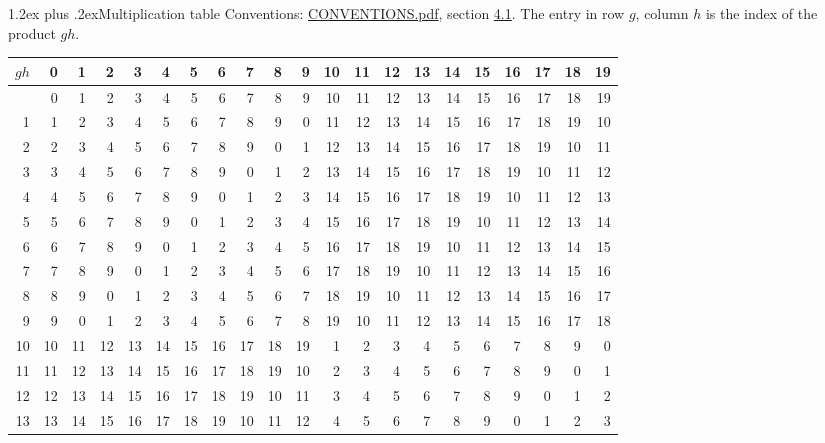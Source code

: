 \documentclass[10pt,a4paper]{article}
\makeatletter
\renewcommand\section{\@startsection{section}{1}{\z@}{-3ex plus -1ex minus -.2ex}%
  {1.2ex plus .2ex}{\normalfont\large\sffamily\bfseries\color{parttitle}}}
\numberwithin{equation}{section}
\makeatother
\begin{document}
\section{Multiplication table}\label{s:multiplication}
Conventions: \href{../../CONVENTIONS.pdf}{CONVENTIONS.pdf}, section \href{../../CONVENTIONS.pdf\#conv.4.1}{4.1}.
The entry in row $g$, column $h$ is the index of the product $gh$.
{\normalsize\setlength{\tabcolsep}{0.1em}\setlength{\LTleft}{-8pt plus 1fill}\setlength{\LTright}{-8pt plus 1fill}\begin{longtable}{@{}r|rrrrrrrrrrrrrrrrrrrr@{}}\toprule
$gh$ & 0 & 1 & 2 & 3 & 4 & 5 & 6 & 7 & 8 & 9 & 10 & 11 & 12 & 13 & 14 & 15 & 16 & 17 & 18 & 19\\\midrule\endhead
\bottomrule\endfoot\endlastfoot
0 & 0 & 1 & 2 & 3 & 4 & 5 & 6 & 7 & 8 & 9 & 10 & 11 & 12 & 13 & 14 & 15 & 16 & 17 & 18 & 19\\*
1 & 1 & 2 & 3 & 4 & 5 & 6 & 7 & 8 & 9 & 0 & 11 & 12 & 13 & 14 & 15 & 16 & 17 & 18 & 19 & 10\\
2 & 2 & 3 & 4 & 5 & 6 & 7 & 8 & 9 & 0 & 1 & 12 & 13 & 14 & 15 & 16 & 17 & 18 & 19 & 10 & 11\\
3 & 3 & 4 & 5 & 6 & 7 & 8 & 9 & 0 & 1 & 2 & 13 & 14 & 15 & 16 & 17 & 18 & 19 & 10 & 11 & 12\\
4 & 4 & 5 & 6 & 7 & 8 & 9 & 0 & 1 & 2 & 3 & 14 & 15 & 16 & 17 & 18 & 19 & 10 & 11 & 12 & 13\\
5 & 5 & 6 & 7 & 8 & 9 & 0 & 1 & 2 & 3 & 4 & 15 & 16 & 17 & 18 & 19 & 10 & 11 & 12 & 13 & 14\\
6 & 6 & 7 & 8 & 9 & 0 & 1 & 2 & 3 & 4 & 5 & 16 & 17 & 18 & 19 & 10 & 11 & 12 & 13 & 14 & 15\\
7 & 7 & 8 & 9 & 0 & 1 & 2 & 3 & 4 & 5 & 6 & 17 & 18 & 19 & 10 & 11 & 12 & 13 & 14 & 15 & 16\\
8 & 8 & 9 & 0 & 1 & 2 & 3 & 4 & 5 & 6 & 7 & 18 & 19 & 10 & 11 & 12 & 13 & 14 & 15 & 16 & 17\\
9 & 9 & 0 & 1 & 2 & 3 & 4 & 5 & 6 & 7 & 8 & 19 & 10 & 11 & 12 & 13 & 14 & 15 & 16 & 17 & 18\\
10 & 10 & 11 & 12 & 13 & 14 & 15 & 16 & 17 & 18 & 19 & 1 & 2 & 3 & 4 & 5 & 6 & 7 & 8 & 9 & 0\\
11 & 11 & 12 & 13 & 14 & 15 & 16 & 17 & 18 & 19 & 10 & 2 & 3 & 4 & 5 & 6 & 7 & 8 & 9 & 0 & 1\\
12 & 12 & 13 & 14 & 15 & 16 & 17 & 18 & 19 & 10 & 11 & 3 & 4 & 5 & 6 & 7 & 8 & 9 & 0 & 1 & 2\\
13 & 13 & 14 & 15 & 16 & 17 & 18 & 19 & 10 & 11 & 12 & 4 & 5 & 6 & 7 & 8 & 9 & 0 & 1 & 2 & 3\\

\end{longtable}}
\end{document}
